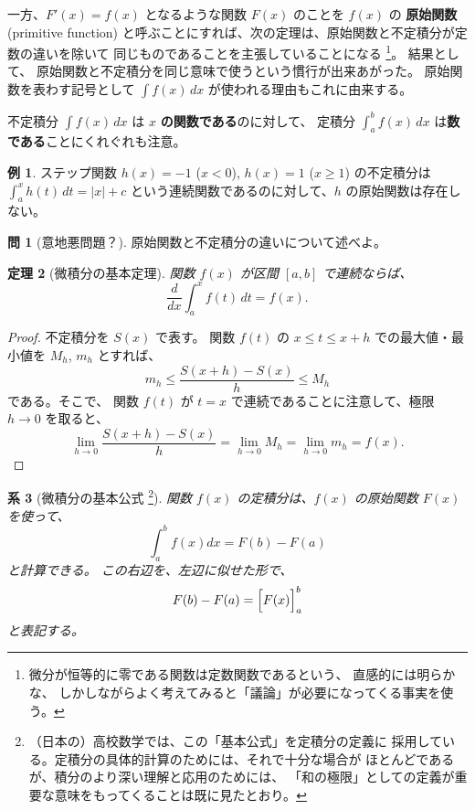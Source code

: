 \documentclass[a4paper]{jsarticle}
\newtheorem{Theorem}{定理}[section]
\newtheorem{Corollary}[Theorem]{系}
\theoremstyle{definition}
\newtheorem{Example}[Theorem]{例}
\newtheorem{Exercise}{問}%
\theoremstyle{remark}
\begin{document}
一方、$F'(x) = f(x)$ となるような関数 $F(x)$ のことを $f(x)$ の
\textbf{原始関数} (primitive function)
と呼ぶことにすれば、次の定理は、原始関数と不定積分が定数の違いを除いて
同じものであることを主張していることになる
\footnote{微分が恒等的に零である関数は定数関数であるという、
直感的には明らかな、
しかしながらよく考えてみると「議論」が必要になってくる事実を使う。
}。
結果として、
原始関数と不定積分を同じ意味で使うという慣行が出来あがった。
原始関数を表わす記号として
$\displaystyle
\int f(x)\,dx
$
が使われる理由もこれに由来する。

不定積分 $\int f(x)\,dx$ は {\boldmath$x$} \textbf{の関数である}のに対して、
定積分 $\int_a^b f(x)\,dx$ は\textbf{数である}ことにくれぐれも注意。

\begin{Example}
  ステップ関数 $h(x) = -1$ ($x < 0$), $h(x) = 1$ ($x \geq 1$) の不定積分は
$\displaystyle \int_a^x h(t)\, dt = |x| + c$ という連続関数であるのに対して、$h$ の原始関数は存在しない。
\end{Example}

\begin{Exercise}[意地悪問題？]
原始関数と不定積分の違いについて述べよ。
\end{Exercise}


\begin{Theorem}[微積分の基本定理]
関数 $f(x)$ が区間 $[a,b]$ で連続ならば、
\[
\frac{d}{dx} \int_a^x f(t)\,dt = f(x).
\]
\end{Theorem}

\begin{proof}
不定積分を $S(x)$ で表す。
関数 $f(t)$ の $x \leq t \leq x + h$ での最大値・最小値を $M_h$, $m_h$ とすれば、
\[
m_h \leq \frac{S(x+h) - S(x)}{h} \leq M_h
\]
である。そこで、
関数 $f(t)$ が $t=x$ で連続であることに注意して、極限 $h \to 0$ を取ると、
\[
\lim_{h \to 0} \frac{S(x+h) - S(x)}{h} = 
\lim_{h \to 0} M_h= \lim_{h \to 0} m_h = f(x). 
\]
\end{proof}

\bigskip
\begin{figure}[htbp]
  \begin{center}

\end{center}
\caption{}
\end{figure}

\begin{Corollary}[微積分の基本公式
\footnote{
（日本の）高校数学では、この「基本公式」を定積分の定義に
採用している。定積分の具体的計算のためには、それで十分な場合が
ほとんどであるが、積分のより深い理解と応用のためには、
「和の極限」としての定義が重要な意味をもってくることは既に見たとおり。
}
]
関数 $f(x)$ の定積分は、$f(x)$ の原始関数 $F(x)$ を使って、
\[
\int_a^b f(x) dx = F(b) - F(a)
\]
と計算できる。
この右辺を、左辺に似せた形で、
\[
F(b) - F(a) = \Bigl[ F(x) \Bigr]_a^b
\]
と表記する。
\end{Corollary}
\end{document}
